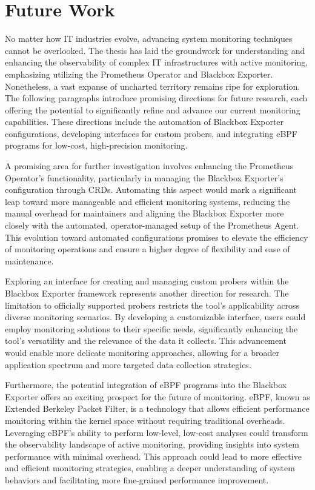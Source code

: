 
\chapter{Future Work}\label{chapter:future_work}

No matter how IT industries evolve, advancing system monitoring techniques cannot be overlooked. The thesis has laid the groundwork for understanding and enhancing the observability of complex IT infrastructures with active monitoring, emphasizing utilizing the Prometheus Operator and Blackbox Exporter. Nonetheless, a vast expanse of uncharted territory remains ripe for exploration. The following paragraphs introduce promising directions for future research, each offering the potential to significantly refine and advance our current monitoring capabilities. These directions include the automation of Blackbox Exporter configurations, developing interfaces for custom probers, and integrating eBPF programs for low-cost, high-precision monitoring. 

A promising area for further investigation involves enhancing the Prometheus Operator's functionality, particularly in managing the Blackbox Exporter's configuration through \ac{CRD}s. Automating this aspect would mark a significant leap toward more manageable and efficient monitoring systems, reducing the manual overhead for maintainers and aligning the Blackbox Exporter more closely with the automated, operator-managed setup of the Prometheus Agent. This evolution toward automated configurations promises to elevate the efficiency of monitoring operations and ensure a higher degree of flexibility and ease of maintenance. 

Exploring an interface for creating and managing custom probers within the Blackbox Exporter framework represents another direction for research. The limitation to officially supported probers restricts the tool's applicability across diverse monitoring scenarios. By developing a customizable interface, users could employ monitoring solutions to their specific needs, significantly enhancing the tool's versatility and the relevance of the data it collects. This advancement would enable more delicate monitoring approaches, allowing for a broader application spectrum and more targeted data collection strategies. 

Furthermore, the potential integration of eBPF programs into the Blackbox Exporter offers an exciting prospect for the future of monitoring. eBPF, known as Extended Berkeley Packet Filter, is a technology that allows efficient performance monitoring within the kernel space without requiring traditional overheads. Leveraging eBPF's ability to perform low-level, low-cost analyses could transform the observability landscape of active monitoring, providing insights into system performance with minimal overhead. This approach could lead to more effective and efficient monitoring strategies, enabling a deeper understanding of system behaviors and facilitating more fine-grained performance improvement. 

